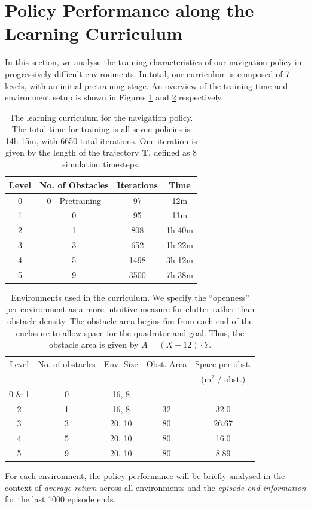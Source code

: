 \section{Policy Performance along the Learning Curriculum}
\label{sec:7_learning_curriculum}
In this section, we analyse the training characteristics of our navigation policy in progressively difficult environments. In total, our curriculum is composed of 7 levels, with an initial pretraining stage. An overview of the training time and environment setup is shown in Figures \ref{tab:7_curriculum} and
\ref{tab:7_curriculum_space} respectively.
\begin{table}[hbt]
    \centering
    \begin{tabular}{||c|c|c|c||}
    \hline
    Level & No. of Obstacles & Iterations & Time \\
    \hline\hline
    0 & 0 - Pretraining & 97 & 12m \\ \hline
    1 & 0 & 95 & 11m \\ \hline
    2 & 1 & 808 & 1h 40m \\ \hline
    3 & 3 & 652 & 1h 22m \\ \hline
    4 & 5 & 1498 & 3h 12m \\ \hline
    5 & 9 & 3500 & 7h 38m \\ \hline
    \end{tabular}
    \caption{The learning curriculum for the navigation policy. The total time for training is all seven policies is 14h 15m, with 6650 total iterations. One iteration is given by the length of the trajectory $\boldsymbol{T}$, defined as 8 simulation timesteps.}
    \label{tab:7_curriculum}
\end{table}
\begin{table}[hbt]
    \centering
    \begin{tabular}{||c|c|c|c|c||}
    \hline
    Level & No. of obstacles & Env. Size & Obst. Area & Space per obst. \\  & & & & (m$^2$ / obst.) \\\hline\hline
    0 \& 1 & 0 & 16, 8 & - & - \\\hline
    2 & 1 & 16, 8 & 32 & 32.0 \\\hline
    3 & 3 & 20, 10 & 80 & 26.67 \\\hline
    4 & 5 & 20, 10 & 80 & 16.0 \\\hline
    5 & 9 & 20, 10 & 80 & 8.89 \\\hline
    \end{tabular}
    \caption{Environments used in the curriculum. We specify the ``openness'' per environment as a more intuitive measure for clutter rather than obstacle density. The obstacle area begins 6m from each end of the enclosure to allow space for the quadrotor and goal. Thus, the obstacle area is given by $A = (X - 12) \cdot Y$.}
    \label{tab:7_curriculum_space}
\end{table}
For each environment, the policy performance will be briefly analysed in the context of \textit{average return} across all environments and the \textit{episode end information} for the last 1000 episode ends.

